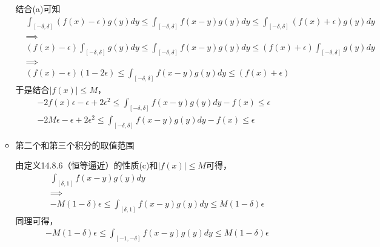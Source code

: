 \documentclass{article}
\begin{document}
\begin{itemize}
\begin{itemize}
                结合(a)可知
                \begin{align*}
                   & \int_{[-\delta, \delta]} (f(x) - \epsilon) g(y) dy \leq \int_{[-\delta, \delta]} f(x - y) g(y) dy \leq \int_{[-\delta, \delta]} (f(x) + \epsilon) g(y) dy   \\
                   & \implies                                                                                                                                                    \\
                   & (f(x) - \epsilon) \int_{[-\delta, \delta]}  g(y) dy \leq \int_{[-\delta, \delta]} f(x - y) g(y) dy \leq (f(x) + \epsilon) \int_{[-\delta, \delta]}  g(y) dy \\
                   & \implies                                                                                                                                                    \\
                   & (f(x) - \epsilon)(1 - 2\epsilon) \leq \int_{[-\delta, \delta]} f(x - y) g(y) dy \leq (f(x) + \epsilon)
                \end{align*}
                于是结合$|f(x)| \leq M$，
                \begin{align*}
                  -2f(x)\epsilon - \epsilon + 2\epsilon^2 \leq \int_{[-\delta, \delta]} f(x - y) g(y) dy - f(x) \leq \epsilon \\
                  -2M\epsilon - \epsilon + 2\epsilon^2 \leq \int_{[-\delta, \delta]} f(x - y) g(y) dy - f(x) \leq \epsilon
                \end{align*}
          \item 第二个和第三个积分的取值范围

                由定义14.8.6（恒等逼近）的性质(c)和$|f(x)| \leq M$可得，
                \begin{align*}
                   & \int_{[\delta, 1]} f(x - y)g(y)dy                                                    \\
                   & \implies                                                                             \\
                   & -M(1-\delta)\epsilon \leq \int_{[\delta, 1]} f(x - y)g(y)dy \leq M(1-\delta)\epsilon
                \end{align*}
                同理可得，
                \begin{align*}
                   & -M(1-\delta)\epsilon \leq \int_{[-1, -\delta]} f(x - y)g(y)dy \leq M(1-\delta)\epsilon
                \end{align*}
        \end{itemize}


\end{itemize}
\end{document}
